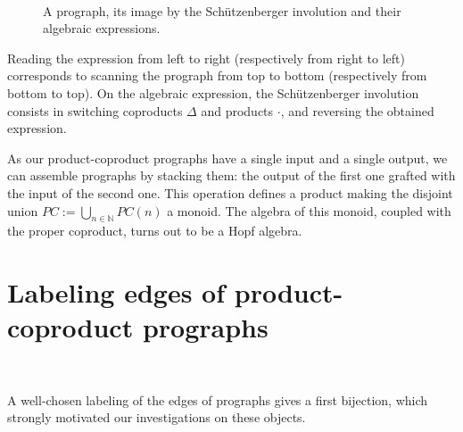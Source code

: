 \documentclass{amsart}
\begin{document}
\begin{figure}[h]
  
\caption{A prograph, its image by the Schützenberger involution and their algebraic expressions.}~\label{algexpr_prograph}

\end{figure}

Reading the expression from left to right (respectively from right to
left) corresponds to scanning the prograph from top to bottom
(respectively from bottom to top). On the algebraic expression, the
Schützenberger involution consists in switching coproducts $\Delta$
and products $\cdot$, and reversing the obtained expression.

As our product-coproduct prographs have a single input and a single
output, we can assemble prographs by stacking them: the output of the
first one grafted with the input of the second one. This operation
defines a product making the disjoint union
$PC := \bigcup_{n \in \mathbb{N}} PC(n)$ a monoid.
The algebra of this monoid, coupled with the proper coproduct, turns
out to be a Hopf algebra. 


\section{Labeling edges of product-coproduct prographs}~\label{section_edges}


A well-chosen labeling of the edges of prographs gives a first
bijection, which strongly motivated our investigations on these
objects.
\end{document}
